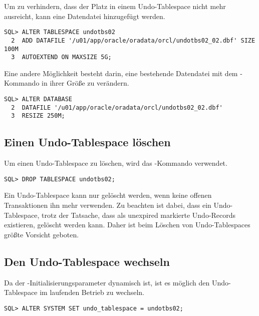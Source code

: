         Um zu verhindern, dass der Platz in einem Undo-Tablespace nicht mehr ausreicht, kann eine Datendatei hinzugef\"ugt werden.
          \begin{lstlisting}[caption={Datendatei zum Undo-Tablespace hinzuf\"ugen},label=admin504,language=oracle_sql]
SQL> ALTER TABLESPACE undotbs02
  2  ADD DATAFILE '/u01/app/oracle/oradata/orcl/undotbs02_02.dbf' SIZE 100M
  3  AUTOEXTEND ON MAXSIZE 5G;
          \end{lstlisting}
          Eine andere M\"oglichkeit besteht darin, eine bestehende Datendatei mit dem -Kommando in ihrer Gr\"o\ss{}e zu ver\"andern.
          \begin{lstlisting}[caption={Datendatei in ihrer Gr\"o\ss{}e ver\"andern},label=admin505,language=oracle_sql]
SQL> ALTER DATABASE
  2  DATAFILE '/u01/app/oracle/oradata/orcl/undotbs02_02.dbf'
  3  RESIZE 250M;
          \end{lstlisting}
      \subsection{Einen Undo-Tablespace l\"oschen}
        Um einen Undo-Tablespace zu l\"oschen, wird das -Kommando verwendet.
        \begin{lstlisting}[caption={Undo-Tablespace l\"oschen},label=admin506,language=oracle_sql]
SQL> DROP TABLESPACE undotbs02;
        \end{lstlisting}
        \begin{merke}
          Ein Undo-Tablespace kann nur gel\"oscht werden, wenn keine offenen Transaktionen ihn mehr verwenden. Zu beachten ist dabei, dass ein Undo-Tablespace, trotz der Tatsache, dass als unexpired markierte Undo-Records existieren, gel\"oscht werden kann. Daher ist beim L\"oschen von Undo-Tablespaces gr\"o\ss{}te Vorsicht geboten.
        \end{merke}
      \subsection{Den Undo-Tablespace wechseln}
        Da der -Initialisierungsparameter dynamisch ist, ist es m\"oglich den Undo-Tablespace im laufenden Betrieb zu wechseln.
        \begin{lstlisting}[caption={Undo-Tablespace wechseln},label=admin507,language=oracle_sql]
SQL> ALTER SYSTEM SET undo_tablespace = undotbs02;
        \end{lstlisting}
